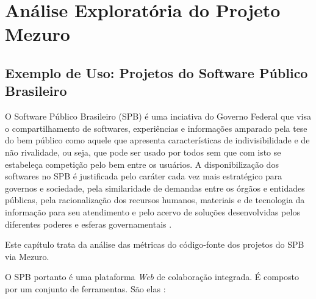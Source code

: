 \chapter{Análise Exploratória do Projeto Mezuro}


\section{Exemplo de Uso: Projetos do Software Público Brasileiro}

O Software Público Brasileiro (SPB) é uma inciativa do Governo Federal que visa
o compartilhamento de softwares, experiências e informações amparado pela tese
do bem público como aquele que apresenta características de indivisibilidade e
de não rivalidade, ou seja, que pode ser usado por todos sem que com isto se
estabeleça competição pelo bem entre os usuários. A disponibilização dos
softwares no SPB é justificada pelo caráter cada vez mais estratégico para
governos e sociedade, pela similaridade de demandas entre os órgãos e entidades
públicas, pela racionalização dos recursos humanos, materiais e de tecnologia
da informação para seu atendimento e pelo acervo de soluções desenvolvidas
pelos diferentes poderes e esferas governamentais \cite{santos2011in01}.

Este capítulo trata da análise das métricas do código-fonte dos projetos do SPB
via Mezuro.

O SPB portanto é uma plataforma \textit{Web} de colaboração integrada. É composto por um
conjunto de ferramentas. São elas \cite{aboutSPB}:

